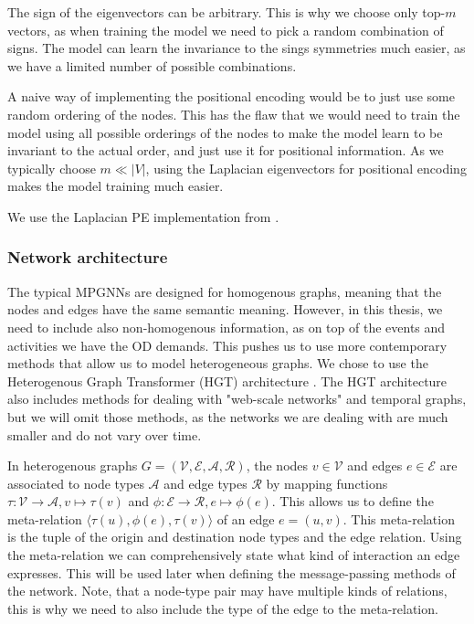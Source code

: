 \documentclass[english, 12pt, a4paper, sci, utf8, a-2b, online]{aaltothesis}
\begin{document}
The sign of the eigenvectors can be arbitrary. This is why we choose only top-$m$ vectors, as when training the model we need to pick a random combination of signs. The model can learn the invariance to the sings symmetries much easier, as we have a limited number of possible combinations.

A naive way of implementing the positional encoding would be to just use some random ordering of the nodes. This has the flaw that we would need to train the model using all possible orderings of the nodes to make the model learn to be invariant to the actual order, and just use it for positional information. As we typically choose $m \ll |V|$, using the Laplacian eigenvectors for positional encoding makes the model training much easier.

We use the Laplacian PE implementation from \cite{LaPE-implementation-2020}.


\subsubsection{Network architecture}

The typical MPGNNs are designed for homogenous graphs, meaning that the nodes and edges have the same semantic meaning. However, in this thesis, we need to include also non-homogenous information, as on top of the events and activities we have the OD demands. This pushes us to use more contemporary methods that allow us to model heterogeneous graphs. We chose to use the Heterogenous Graph Transformer (HGT) architecture \cite{hgt-2020}. The HGT architecture also includes methods for dealing with "web-scale networks" and temporal graphs, but we will omit those methods, as the networks we are dealing with are much smaller and do not vary over time.

In heterogenous graphs $G = (\mathcal{V}, \mathcal{E}, \mathcal{A}, \mathcal{R})$, the nodes $v \in \mathcal{V}$ and edges $e \in \mathcal{E}$ are associated to node types $\mathcal{A}$ and edge types $\mathcal{R}$ by mapping functions $\tau: \mathcal{V} \to \mathcal{A}, v \mapsto \tau(v)$ and $\phi: \mathcal{E} \to \mathcal{R}, e \mapsto \phi(e)$. This allows us to define the meta-relation $\langle \tau(u), \phi(e), \tau(v)\rangle$ of an edge $e=(u,v)$. This meta-relation is the tuple of the origin and destination node types and the edge relation. Using the meta-relation we can comprehensively state what kind of interaction an edge expresses. This will be used later when defining the message-passing methods of the network. Note, that a node-type pair may have multiple kinds of relations, this is why we need to also include the type of the edge to the meta-relation.
\end{document}
